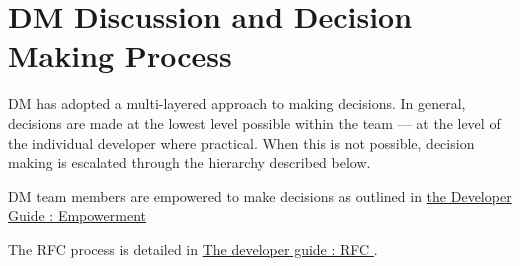 \section{DM Discussion and Decision Making Process}
\label{sect:ddmp}

DM has adopted a multi-layered approach to making decisions.
In general, decisions are made at the lowest level possible within the team --- at the level of the individual developer where practical.
When this is not possible, decision making is escalated through the
hierarchy described below.

DM team members are empowered to make decisions as outlined in \href{https://developer.lsst.io/team/empowerment.html}{the Developer Guide : Empowerment}

The \gls{RFC} process is detailed in \href{https://developer.lsst.io/communications/rfc.html}{The developer guide : RFC }.


